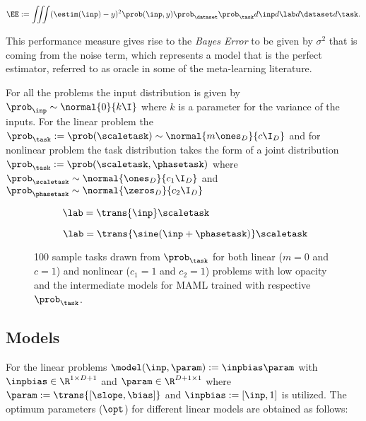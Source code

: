 \begin{equation}\label{eq:ee}
  \EE:= \iiint(\estim(\inp) - y)^2\prob(\inp, y)\prob_{\dataset}\prob_{\task} d\inp d\lab d\dataset d\task.
\end{equation}


This performance measure gives rise to the \textit{Bayes Error} to be given by $\sigma^2$ that is coming from the noise term, which represents a model that is the perfect estimator, referred to as oracle in some of the meta-learning literature.

For all the problems the input distribution is given by $\prob_\inp\sim\normal{0}{k\I}$ where $k$ is a parameter for the variance of the inputs. For the linear problem the $\prob_\task:=\prob(\scaletask)\sim\normal{{m\ones_{D}}}{{c\I_{D}}}$ and for nonlinear problem the task distribution takes the form of a joint distribution $\prob_\task:=\prob(\scaletask, \phasetask)$ where $\prob_{\scaletask}\sim\normal{\ones_{D}}{c_1\I_{D}}$ and $\prob_{\phasetask}\sim\normal{\zeros_{D}}{c_2\I_{D}}$

\begin{figure}[ht!]
  \centering
  \begin{subfigure}[b]{0.49\textwidth}
    \centering
    \caption{$\lab = \trans{\inp}\scaletask$}
    \label{fig:lintasks}
  \end{subfigure}
  \begin{subfigure}[b]{0.49\textwidth}
    \centering
    \caption{$\lab = \trans{\sine(\inp+\phasetask)}\scaletask$}
    \label{fig:nonlintasks}
  \end{subfigure}
  \caption{100 sample tasks drawn from $\prob_\task$ for both linear ($m=0$ and $c=1$) and nonlinear ($c_1=1$ and $c_2=1$) problems with low opacity and the intermediate models for MAML trained with respective $\prob_\task$.}
\end{figure}

\subsection{Models} 

For the linear problems $\model(\inp, \param):=\inpbias\param$ with $\inpbias\in\R^{1\times D+1}$ and $\param\in\R^{D+1\times 1}$ where $\param:=\trans{[\slope, \bias]}$ and $\inpbias:=[\inp, 1]$ is utilized. The optimum parameters ($\opt$) for different linear models are obtained as follows:

